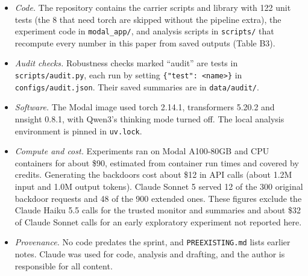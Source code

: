 \documentclass[11pt,letterpaper]{article}
\providecommand{\tightlist}{\setlength{\itemsep}{1pt}\setlength{\parskip}{0pt}}
\begin{document}
\begin{itemize}
\tightlist
\item \emph{Code.} The repository contains the carrier scripts and library with 122 unit tests (the 8 that need torch are skipped without the pipeline extra), the experiment code in \texttt{modal\_app/}, and analysis scripts in \texttt{scripts/} that recompute every number in this paper from saved outputs (Table B3).
\item \emph{Audit checks.} Robustness checks marked ``audit'' are tests in \texttt{scripts/audit.py}, each run by setting \texttt{\{"test": <name>\}} in \texttt{configs/audit.json}. Their saved summaries are in \texttt{data/audit/}.
\item \emph{Software.} The Modal image used torch 2.14.1, transformers 5.20.2 and nnsight 0.8.1, with Qwen3's thinking mode turned off. The local analysis environment is pinned in \texttt{uv.lock}.
\item \emph{Compute and cost.} Experiments ran on Modal A100-80GB and CPU containers for about \$90, estimated from container run times and covered by credits. Generating the backdoors cost about \$12 in API calls (about 1.2M input and 1.0M output tokens). Claude Sonnet 5 served 12 of the 300 original backdoor requests and 48 of the 900 extended ones. These figures exclude the Claude Haiku 5.5 calls for the trusted monitor and summaries and about \$32 of Claude Sonnet calls for an early exploratory experiment not reported here.
\item \emph{Provenance.} No code predates the sprint, and \texttt{PREEXISTING.md} lists earlier notes. Claude was used for code, analysis and drafting, and the author is responsible for all content.
\end{itemize}
\end{document}
